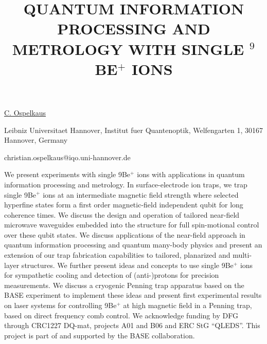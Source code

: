 \title{QUANTUM INFORMATION PROCESSING AND METROLOGY WITH SINGLE $^9$BE$^+$ IONS}

\underline{C. Ospelkaus} 

{\normalsize{\vspace{-4mm}
Leibniz Universitaet Hannover,
Institut fuer Quantenoptik,
Welfengarten 1,
30167 Hannover,
Germany

\email christian.ospelkaus@iqo.uni-hannover.de}}

We present experiments with single 9Be$^+$ ions with applications in quantum information processing and metrology. In surface-electrode ion traps, we trap single 9Be$^+$ ions at an intermediate magnetic field strength where selected hyperfine states form a first order magnetic-field independent qubit for long coherence times. We discuss the design and operation of tailored near-field microwave waveguides embedded into the structure for full spin-motional control over these qubit states. We discuss applications of the near-field approach in quantum information processing and quantum many-body physics and present an extension of our trap fabrication capabilities to tailored, planarized and multi-layer structures. We further present ideas and concepts to use single 9Be$^+$ ions for sympathetic cooling and detection of (anti-)protons for precision measurements. We discuss a cryogenic Penning trap apparatus based on the BASE experiment to implement these ideas and present first experimental results on laser systems for controlling 9Be$^+$ at high magnetic field in a Penning trap, based on direct frequency comb control. We acknowledge funding by DFG through CRC1227 DQ-mat, projects A01 and B06 and ERC StG ``QLEDS''. This project is part of and supported by the BASE collaboration.

\vspace{\baselineskip} 